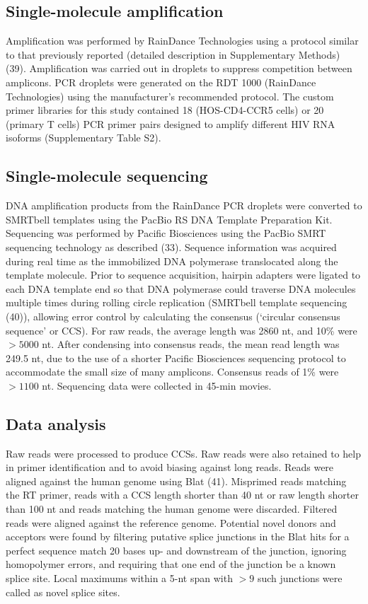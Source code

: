 \documentclass[../sherrill-Mix_thesis.tex]{subfiles}
\begin{document}
\subsection{Single-molecule amplification}
Amplification was performed by RainDance Technologies using a protocol similar to that previously reported (detailed description in Supplementary Methods) (39). Amplification was carried out in droplets to suppress competition between amplicons. PCR droplets were generated on the RDT 1000 (RainDance Technologies) using the manufacturer's recommended protocol. The custom primer libraries for this study contained 18 (HOS-CD4-CCR5 cells) or 20 (primary T cells) PCR primer pairs designed to amplify different HIV RNA isoforms (Supplementary Table S2). 

\subsection{Single-molecule sequencing}
DNA amplification products from the RainDance PCR droplets were converted to SMRTbell templates using the PacBio RS DNA Template Preparation Kit. Sequencing was performed by Pacific Biosciences using the PacBio SMRT sequencing technology as described (33). Sequence information was acquired during real time as the immobilized DNA polymerase translocated along the template molecule. Prior to sequence acquisition, hairpin adapters were ligated to each DNA template end so that DNA polymerase could traverse DNA molecules multiple times during rolling circle replication (SMRTbell template sequencing (40)), allowing error control by calculating the consensus (`circular consensus sequence' or CCS). For raw reads, the average length was 2860 nt, and 10\% were $>5000$ nt. After condensing into consensus reads, the mean read length was 249.5 nt, due to the use of a shorter Pacific Biosciences sequencing protocol to accommodate the small size of many amplicons. Consensus reads of 1\% were $>1100$ nt. Sequencing data were collected in 45-min movies.

\subsection{Data analysis}
Raw reads were processed to produce CCSs. Raw reads were also retained to help in primer identification and to avoid biasing against long reads. Reads were aligned against the human genome using Blat (41). Misprimed reads matching the RT primer, reads with a CCS length shorter than 40 nt or raw length shorter than 100 nt and reads matching the human genome were discarded. Filtered reads were aligned against the \hivEight{} reference genome. Potential novel donors and acceptors were found by filtering putative splice junctions in the Blat hits for a perfect sequence match 20 bases up- and downstream of the junction, ignoring homopolymer errors, and requiring that one end of the junction be a known splice site. Local maximums within a 5-nt span with $>9$ such junctions were called as novel splice sites.
\end{document}
